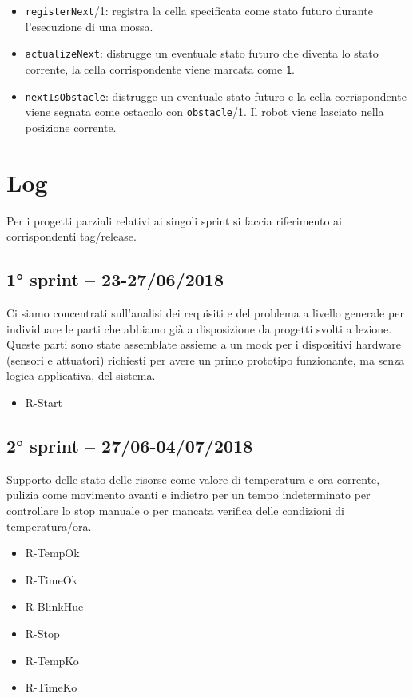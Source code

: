 \begin{itemize}
	\item \texttt{registerNext}/1: registra la cella specificata come stato futuro durante l'esecuzione di una mossa.
	\item \texttt{actualizeNext}: distrugge un eventuale stato futuro che diventa lo stato corrente, la cella corrispondente viene marcata come \texttt{1}.
	\item \texttt{nextIsObstacle}: distrugge un eventuale stato futuro e la cella corrispondente viene segnata come ostacolo con \texttt{obstacle}/1. Il robot viene lasciato nella posizione corrente.
\end{itemize}

\section{Log}

Per i progetti parziali relativi ai singoli sprint si faccia riferimento ai corrispondenti tag/release.

\subsection{1° sprint -- 23-27/06/2018}
Ci siamo concentrati sull'analisi dei requisiti e del problema a livello generale per individuare le parti che abbiamo già a disposizione da progetti svolti a lezione. Queste parti sono state assemblate assieme a un mock per i dispositivi hardware (sensori e attuatori) richiesti per avere un primo prototipo funzionante, ma senza logica applicativa, del sistema.

\begin{itemize}
	\ttfamily
	\item R-Start
\end{itemize}

\subsection{2° sprint -- 27/06-04/07/2018}
Supporto delle stato delle risorse come valore di temperatura e ora corrente, pulizia come movimento avanti e indietro per un tempo indeterminato per controllare lo stop manuale o per mancata verifica delle condizioni di temperatura/ora.

\begin{itemize}
	\ttfamily
	\item R-TempOk
	\item R-TimeOk
	\item R-BlinkHue
	\item R-Stop
	\item R-TempKo
	\item R-TimeKo
\end{itemize}

